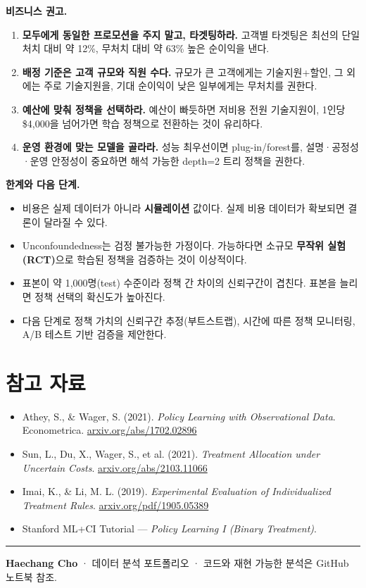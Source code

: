 \documentclass[11pt]{article}
\begin{document}
\textbf{비즈니스 권고.}
\begin{enumerate}[leftmargin=1.6em, itemsep=2pt]
  \item \textbf{모두에게 동일한 프로모션을 주지 말고, 타겟팅하라.} 고객별 타겟팅은 최선의 단일 처치 대비 약 12\%, 무처치 대비 약 63\% 높은 순이익을 낸다.
  \item \textbf{배정 기준은 고객 규모와 직원 수다.} 규모가 큰 고객에게는 기술지원+할인, 그 외에는 주로 기술지원을, 기대 순이익이 낮은 일부에게는 무처치를 권한다.
  \item \textbf{예산에 맞춰 정책을 선택하라.} 예산이 빠듯하면 저비용 전원 기술지원이, 1인당 \$4{,}000을 넘어가면 학습 정책으로 전환하는 것이 유리하다.
  \item \textbf{운영 환경에 맞는 모델을 골라라.} 성능 최우선이면 plug-in/forest를, 설명·공정성·운영 안정성이 중요하면 해석 가능한 depth=2 트리 정책을 권한다.
\end{enumerate}

\textbf{한계와 다음 단계.}
\begin{itemize}[leftmargin=1.4em, itemsep=2pt]
  \item 비용은 실제 데이터가 아니라 \textbf{시뮬레이션} 값이다. 실제 비용 데이터가 확보되면 결론이 달라질 수 있다.
  \item Unconfoundedness는 검정 불가능한 가정이다. 가능하다면 소규모 \textbf{무작위 실험(RCT)}으로 학습된 정책을 검증하는 것이 이상적이다.
  \item 표본이 약 1{,}000명(test) 수준이라 정책 간 차이의 신뢰구간이 겹친다. 표본을 늘리면 정책 선택의 확신도가 높아진다.
  \item 다음 단계로 정책 가치의 신뢰구간 추정(부트스트랩), 시간에 따른 정책 모니터링, A/B 테스트 기반 검증을 제안한다.
\end{itemize}

\section*{\sffamily\color{brand} 참고 자료}
\small
\begin{itemize}[leftmargin=1.4em, itemsep=2pt]
  \item Athey, S., \& Wager, S. (2021). \emph{Policy Learning with Observational Data}. Econometrica. \href{https://arxiv.org/abs/1702.02896}{arxiv.org/abs/1702.02896}
  \item Sun, L., Du, X., Wager, S., et al. (2021). \emph{Treatment Allocation under Uncertain Costs}. \href{https://arxiv.org/abs/2103.11066}{arxiv.org/abs/2103.11066}
  \item Imai, K., \& Li, M. L. (2019). \emph{Experimental Evaluation of Individualized Treatment Rules}. \href{https://arxiv.org/pdf/1905.05389.pdf}{arxiv.org/pdf/1905.05389}
  \item Stanford ML+CI Tutorial --- \emph{Policy Learning I (Binary Treatment)}.
\end{itemize}

\vspace{1em}
{\color{rulegray}\hrule}
\vspace{4pt}
{\footnotesize\color{ink} \textbf{Haechang Cho} · 데이터 분석 포트폴리오 · 코드와 재현 가능한 분석은 GitHub 노트북 참조.}
\end{document}
